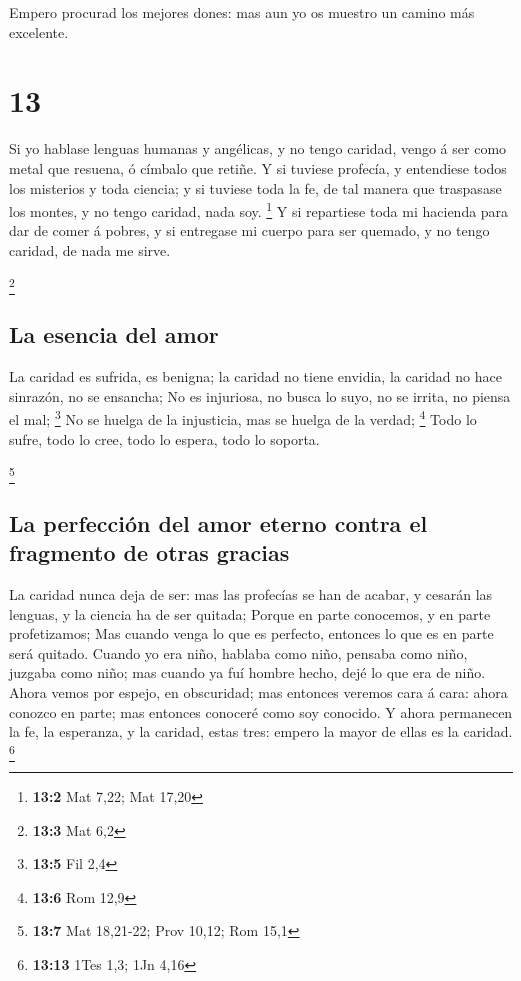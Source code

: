  Empero procurad los mejores dones: mas aun yo os muestro
un camino más excelente.

\hypertarget{section-12}{%
\section{13}\label{section-12}}

 Si yo hablase lenguas humanas y angélicas, y no tengo
caridad, vengo á ser como metal que resuena, ó címbalo que retiñe.
 Y si tuviese profecía, y entendiese todos los misterios y
toda ciencia; y si tuviese toda la fe, de tal manera que traspasase los
montes, y no tengo caridad, nada soy. \footnote{\textbf{13:2} Mat 7,22;
  Mat 17,20}  Y si repartiese toda mi hacienda para dar de
comer á pobres, y si entregase mi cuerpo para ser quemado, y no tengo
caridad, de nada me sirve.

\footnote{\textbf{13:3} Mat 6,2}

\hypertarget{la-esencia-del-amor}{%
\subsection{La esencia del amor}\label{la-esencia-del-amor}}

 La caridad es sufrida, es benigna; la caridad no tiene
envidia, la caridad no hace sinrazón, no se ensancha;  No es
injuriosa, no busca lo suyo, no se irrita, no piensa el mal; \footnote{\textbf{13:5}
  Fil 2,4}  No se huelga de la injusticia, mas se huelga de
la verdad; \footnote{\textbf{13:6} Rom 12,9}  Todo lo sufre,
todo lo cree, todo lo espera, todo lo soporta.

\footnote{\textbf{13:7} Mat 18,21-22; Prov 10,12; Rom 15,1}

\hypertarget{la-perfecciuxf3n-del-amor-eterno-contra-el-fragmento-de-otras-gracias}{%
\subsection{La perfección del amor eterno contra el fragmento de otras
gracias}\label{la-perfecciuxf3n-del-amor-eterno-contra-el-fragmento-de-otras-gracias}}

 La caridad nunca deja de ser: mas las profecías se han de
acabar, y cesarán las lenguas, y la ciencia ha de ser quitada;
 Porque en parte conocemos, y en parte profetizamos;
 Mas cuando venga lo que es perfecto, entonces lo que es en
parte será quitado.  Cuando yo era niño, hablaba como niño,
pensaba como niño, juzgaba como niño; mas cuando ya fuí hombre hecho,
dejé lo que era de niño.  Ahora vemos por espejo, en
obscuridad; mas entonces veremos cara á cara: ahora conozco en parte;
mas entonces conoceré como soy conocido.  Y ahora
permanecen la fe, la esperanza, y la caridad, estas tres: empero la
mayor de ellas es la caridad. \footnote{\textbf{13:13} 1Tes 1,3; 1Jn
  4,16}

